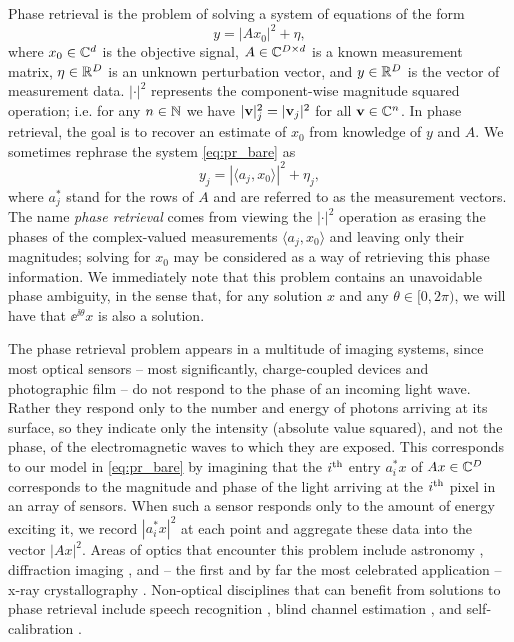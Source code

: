 Phase retrieval is the problem of solving a system of equations of the form \begin{equation} y = |A x_0|^2 + \eta, \label{eq:pr_bare} \end{equation} where $x_0 \in \mathbb{C}^d$ is the objective signal, $A \in \mathbb{C}^{D \times d}$ is a known measurement matrix, $\eta \in \mathbb{R}^D$ is an unknown perturbation vector, and $y \in \mathbb{R}^D$ is the vector of measurement data.  $|\cdot|^2$ represents the component-wise magnitude squared operation; i.e. for any $n \in \mathbb{N}$ we have $|\mathbf{v}|^2_j = |\mathbf{v}_j|^2$ for all $\mathbf{v} \in \mathbb{C}^n$.  In phase retrieval, the goal is to recover an estimate of $x_0$ from knowledge of $y$ and $A$.  We sometimes rephrase the system \eqref{eq:pr_bare} as \begin{equation} y_j = | \langle a_j, x_0 \rangle |^2 + \eta_j, \end{equation} where $a_j^*$ stand for the rows of $A$ and are referred to as the measurement vectors.  The name \emph{phase retrieval} comes from viewing the $|\cdot|^2$ operation as erasing the phases of the complex-valued measurements $\langle a_j, x_0 \rangle$ and leaving only their magnitudes; solving for $x_0$ may be considered as a way of retrieving this phase information.  We immediately note that this problem contains an unavoidable phase ambiguity, in the sense that, for any solution $x$ and any $\theta \in [0, 2\pi)$, we will have that $\ee^{\ii \theta} x$ is also a solution.

  The phase retrieval problem appears in a multitude of imaging systems, since most optical sensors -- most significantly, charge-coupled devices and photographic film -- do not respond to the phase of an incoming light wave.  Rather they respond only to the number and energy of photons arriving at its surface, so they indicate only the intensity (absolute value squared), and not the phase, of the electromagnetic waves to which they are exposed.  This corresponds to our model in \eqref{eq:pr_bare} by imagining that the $i^{\text{th}}$ entry $a_i^* x$ of $Ax \in \mathbb{C}^D$ corresponds to the magnitude and phase of the light arriving at the $i^{\text{th}}$ pixel in an array of sensors.  When such a sensor responds only to the amount of energy exciting it, we record $|a_i^* x|^2$ at each point and aggregate these data into the vector $|A x|^2$.  Areas of optics that encounter this problem include astronomy \cite{walther1963question}, diffraction imaging \cite{diffraction_ref}, and -- the first and by far the most celebrated application -- x-ray crystallography \cite{crystallography_refs}.  Non-optical disciplines that can benefit from solutions to phase retrieval include speech recognition \cite{balan2006signal, juang1993speechrec}, blind channel estimation \cite{strohmer2017wtf_deconv1, strohmer2017wtf_deconv2}, and self-calibration \cite{strohmer2015self_calib}.

